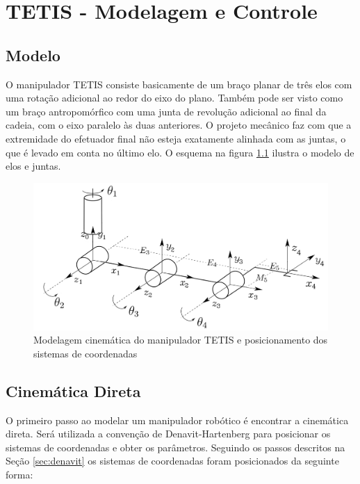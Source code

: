 \chapter{TETIS - Modelagem e Controle}


\section{Modelo}
O manipulador TETIS consiste basicamente de um braço planar de três elos com uma rotação adicional ao redor do eixo do plano. Também pode ser visto como um braço antropomórfico com uma junta de revolução adicional ao final da cadeia, com o eixo paralelo às duas anteriores. O projeto mecânico faz com que a extremidade do efetuador final não esteja exatamente alinhada com as juntas, o que é levado em conta no último elo. O esquema na figura \ref{fig:modelo_tetis} ilustra o modelo de elos e juntas. 
\begin{figure}[!ht]
\centering
  \includegraphics[width=0.9\linewidth]{./img/model3.png}
  \caption{Modelagem cinemática do manipulador TETIS e posicionamento dos sistemas de coordenadas}
  \label{fig:modelo_tetis}
\end{figure}%

\section{Cinemática Direta}
O primeiro passo ao modelar um manipulador robótico é encontrar a cinemática direta. Será utilizada a convenção de Denavit-Hartenberg para posicionar os sistemas de coordenadas e obter os parâmetros. Seguindo os passos descritos na Seção \ref{sec:denavit} os sistemas de coordenadas foram posicionados da seguinte forma:

